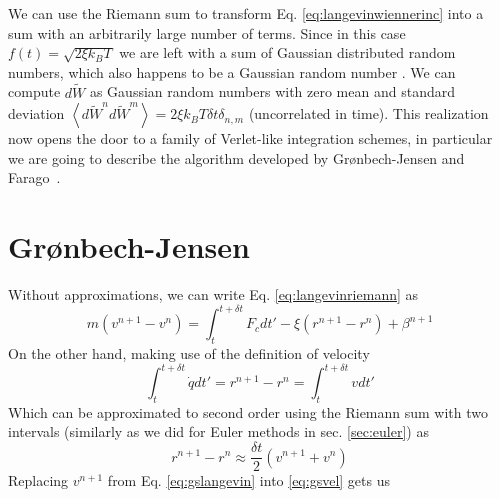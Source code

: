 \documentclass[twoside,openright,titlepage,numbers=noenddot,%
headinclude,footinclude,cleardoublepage=empty,abstract=on,
BCOR=5mm,fontsize=11pt, dvipsnames, paper=b5
]{scrreprt}
\newcommand{\dt}{\delta t}
\newcommand{\kT}{k_B T}
\newcommand{\noise}{\widetilde{W}}
\newcommand{\ppos}{q}
\begin{document}
We can use the Riemann sum to transform Eq. \eqref{eq:langevinwiennerinc} into a sum with an arbitrarily large number of terms. Since in this case $f(t) = \sqrt{2\xi\kT}$ we are left with a sum of Gaussian distributed random numbers, which also happens to be a Gaussian random number . We can compute $d\noise$ as Gaussian random numbers with zero mean and standard deviation $\left\langle d\noise^nd\noise^m\right\rangle = 2\xi\kT\dt\delta_{n,m}$ (uncorrelated in time).
This realization now opens the door to a family of Verlet-like integration schemes, in particular we are going to describe the algorithm developed by Grønbech-Jensen and Farago~\cite{Gronbech2013}.

\section{Grønbech-Jensen}\label{sec:gronbechjensen}
Without approximations, we can write Eq. \eqref{eq:langevinriemann} as
\begin{equation}
  \label{eq:gslangevin}
  m\left(v^{n+1}-v^n\right) = \int_t^{t+\dt}F_c dt' - \xi\left(r^{n+1}-r^n\right) + \beta^{n+1}
\end{equation}
On the other hand, making use of the definition of velocity
\begin{equation}
  \int_t^{t+\dt}\dot{\ppos}dt' = r^{n+1} - r^n = \int_t^{t+\dt}vdt'
\end{equation}
Which can be approximated to second order using the Riemann sum with two intervals (similarly as we did for Euler methods in sec. \ref{sec:euler}) as
\begin{equation}
  \label{eq:gsvel}
  r^{n+1} - r^n \approx \frac{\dt}{2}\left(v^{n+1}+v^n\right)
\end{equation}
Replacing $v^{n+1}$ from Eq. \eqref{eq:gslangevin} into \eqref{eq:gsvel} gets us
\end{document}
